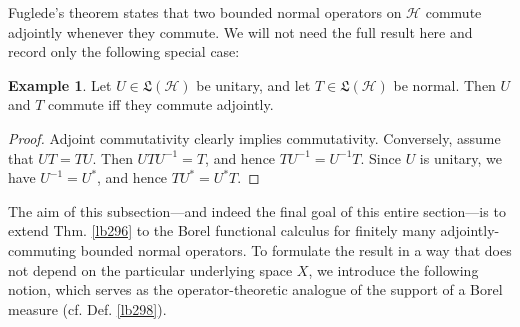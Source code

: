\documentclass[12pt,b5paper,notitlepage]{article}
\theoremstyle{definition}
\newtheorem{eg}[df]{Example}
\theoremstyle{plain}
\DeclareMathOperator{\Borb}{{\mathscr{B}\text{\kern -2pt {\calligra\large or}}\,}_{\mathrm b}}
\newcommand{\fk}{\mathfrak}
\newcommand{\ovl}{\overline}
\newcommand{\MH}{\mathcal H}
\numberwithin{equation}{section}
\begin{document}
\begin{comment}
\begin{eg}
Let $T\in\fk L(\MH)$ be self-adjoint and $R\geq\Vert T\Vert$. Let $f,g\in\Borb([-R,R])$. Then, $f(T)$ and $g(T)$ are adjointly-commuting bounded normal operators. 
\end{eg}

\begin{proof}
The operators $f(T)$ and $g(T)$ commute, since
\begin{align*}
f(T)g(T)=(fg)(T)=(gf)(T)=g(T)f(T)
\end{align*}
Replacing $g$ with $\ovl g$, and noting that $\ovl g(T)=g(T)^*$, we get $[f(T),g(T)^*]=0$. Thus $f(T)$ commutes adjointly with $g(T)$. Replacing $g$ with $f$, we conclude that $f(T)$ is normal. Similarly, $g(T)$ is normal.
\end{proof}
\end{comment}




Fuglede's theorem states that two bounded normal operators on $\MH$ commute adjointly whenever they commute. We will not need the full result here and record only the following special case:

\begin{eg}\label{lb429}
Let $U\in\fk L(\MH)$ be unitary, and let $T\in\fk L(\MH)$ be normal. Then $U$ and $T$ commute iff they commute adjointly.
\end{eg}


\begin{proof}
Adjoint commutativity clearly implies commutativity. Conversely, assume that $UT=TU$. Then $UTU^{-1}=T$, and hence $TU^{-1}=U^{-1}T$. Since $U$ is unitary, we have $U^{-1}=U^*$, and hence $TU^*=U^*T$.
\end{proof}




The aim of this subsection---and indeed the final goal of this entire section---is to extend Thm. \ref{lb296} to the Borel functional calculus for finitely many adjointly-commuting bounded normal operators. To formulate the result in a way that does not depend on the particular underlying space $X$, we introduce the following notion, which serves as the operator-theoretic analogue of the support of a Borel measure (cf. Def. \ref{lb298}).
\end{document}
